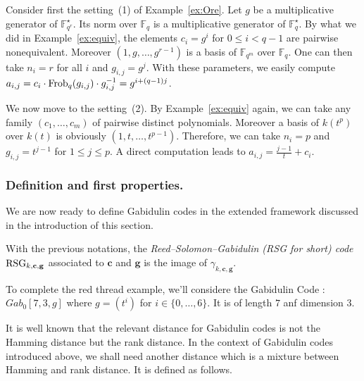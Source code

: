 \documentclass[a4paper]{llncs}
\newcommand{\FF}{\mathbb F}
\newcommand{\Frob}{\textrm{\rm Frob}}
\newcommand{\bc}{\textbf{c}}
\newcommand{\bg}{\textbf{g}}
\newcommand{\RSG}{\textrm{\rm RSG}}
\begin{document}
\begin{example}
\label{ex:aij}
Consider first the setting~(1) of Example~\ref{ex:Ore}.
Let $g$ be a multiplicative generator of $\FF_{q^r}^\star$. Its norm
over $\FF_q$ is a multiplicative generator of $\FF_q^\star$. By what
we did in Example~\ref{ex:equiv}, the elements $c_i = g^i$ for $0 
\leq i < q-1$ are pairwise nonequivalent. Moreover $(1, g, \ldots,
g^{r-1})$ is a basis of $\FF_{q^m}$ over $\FF_q$. One can then
take $n_i = r$ for all $i$ and $g_{i,j} = g^j$. With these parameters,
we easily compute $a_{i,j} = c_i \cdot \Frob_q(g_{i,j}) \cdot g_{i,j}^{-1}
= g^{i + (q-1)j}$. 

We now move to the setting~(2). By Example~\ref{ex:equiv} again,
we can take any family $(c_1, \ldots, c_m)$ of pairwise distinct
polynomials. Moreover a basis of $k(t^p)$ over $k(t)$ is obviously
$(1, t, \ldots, t^{p-1})$. Therefore, we can take $n_i = p$ and
$g_{i,j} = t^{j-1}$ for $1 \leq j \leq p$. A direct computation
leads to $a_{i,j} = \frac{j-1} t + c_i$.
\end{example}

\subsubsection*{Definition and first properties.}

We are now ready to define Gabidulin codes in the extended framework
discussed in the introduction of this section.

\begin{definition}
With the previous notations, the \emph{Reed--Solomon--Gabidulin (RSG for 
short) code} $\RSG_{k,\bc,\bg}$ associated to $\bc$ and $\bg$ is the 
image of $\gamma_{k,\bc,\bg}$. \end{definition}

\begin{example}
To complete the red thread example, we'll considere the Gabidulin Code : $Gab_0[7,3,g]$ where $g = (t^i)$ for $i \in \{0, \dots, 6\}$. It is of length  $7$ anf dimension $3$.
\end{example}

It is well known that the relevant distance for Gabidulin codes is not 
the Hamming distance but the rank distance. In the context of Gabidulin 
codes introduced above, we shall need another distance which is a 
mixture between Hamming and rank distance. It is defined as follows.
\end{document}
